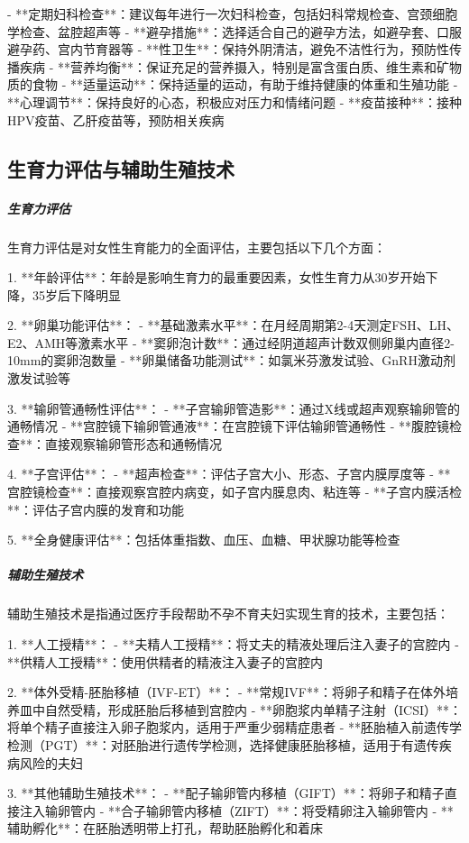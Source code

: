 \begin{enumerate}
- **定期妇科检查**：建议每年进行一次妇科检查，包括妇科常规检查、宫颈细胞学检查、盆腔超声等
- **避孕措施**：选择适合自己的避孕方法，如避孕套、口服避孕药、宫内节育器等
- **性卫生**：保持外阴清洁，避免不洁性行为，预防性传播疾病
- **营养均衡**：保证充足的营养摄入，特别是富含蛋白质、维生素和矿物质的食物
- **适量运动**：保持适量的运动，有助于维持健康的体重和生殖功能
- **心理调节**：保持良好的心态，积极应对压力和情绪问题
- **疫苗接种**：接种HPV疫苗、乙肝疫苗等，预防相关疾病

\subsection{生育力评估与辅助生殖技术}

\subparagraph{生育力评估}

生育力评估是对女性生育能力的全面评估，主要包括以下几个方面：

1. **年龄评估**：年龄是影响生育力的最重要因素，女性生育力从30岁开始下降，35岁后下降明显

2. **卵巢功能评估**：
   - **基础激素水平**：在月经周期第2-4天测定FSH、LH、E2、AMH等激素水平
   - **窦卵泡计数**：通过经阴道超声计数双侧卵巢内直径2-10mm的窦卵泡数量
   - **卵巢储备功能测试**：如氯米芬激发试验、GnRH激动剂激发试验等

3. **输卵管通畅性评估**：
   - **子宫输卵管造影**：通过X线或超声观察输卵管的通畅情况
   - **宫腔镜下输卵管通液**：在宫腔镜下评估输卵管通畅性
   - **腹腔镜检查**：直接观察输卵管形态和通畅情况

4. **子宫评估**：
   - **超声检查**：评估子宫大小、形态、子宫内膜厚度等
   - **宫腔镜检查**：直接观察宫腔内病变，如子宫内膜息肉、粘连等
   - **子宫内膜活检**：评估子宫内膜的发育和功能

5. **全身健康评估**：包括体重指数、血压、血糖、甲状腺功能等检查

\subparagraph{辅助生殖技术}

辅助生殖技术是指通过医疗手段帮助不孕不育夫妇实现生育的技术，主要包括：

1. **人工授精**：
   - **夫精人工授精**：将丈夫的精液处理后注入妻子的宫腔内
   - **供精人工授精**：使用供精者的精液注入妻子的宫腔内

2. **体外受精-胚胎移植（IVF-ET）**：
   - **常规IVF**：将卵子和精子在体外培养皿中自然受精，形成胚胎后移植到宫腔内
   - **卵胞浆内单精子注射（ICSI）**：将单个精子直接注入卵子胞浆内，适用于严重少弱精症患者
   - **胚胎植入前遗传学检测（PGT）**：对胚胎进行遗传学检测，选择健康胚胎移植，适用于有遗传疾病风险的夫妇

3. **其他辅助生殖技术**：
   - **配子输卵管内移植（GIFT）**：将卵子和精子直接注入输卵管内
   - **合子输卵管内移植（ZIFT）**：将受精卵注入输卵管内
   - **辅助孵化**：在胚胎透明带上打孔，帮助胚胎孵化和着床


\end{enumerate}
